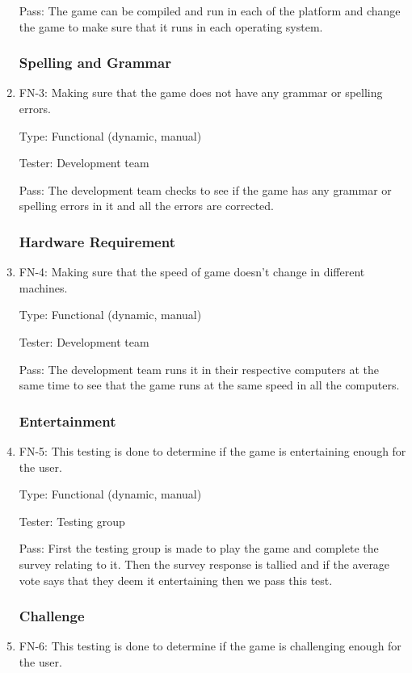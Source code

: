 \documentclass[12pt,letterpaper]{article}
\begin{document}
\begin{enumerate}
	Pass: The game can be compiled and run in each of the platform and change the game to make sure that it runs in each operating system.

	\subsubsection{Spelling and Grammar}
	\item FN-3: Making sure that the game does not have any grammar or spelling errors.

	Type: Functional (dynamic, manual)

	Tester: Development team

	Pass: The development team checks to see if the game has any grammar or spelling errors in it and all the errors are corrected.
	
	\subsubsection{Hardware Requirement}
	\item FN-4: Making sure that the speed of game doesn’t change in different machines. 

	Type: Functional (dynamic, manual)
	
	Tester: Development team
	
	Pass: The development team runs it in their respective computers at the same time to see that the game runs at the same speed in all the computers.

	\subsubsection{Entertainment}
	\item FN-5: This testing is done to determine if the game is entertaining enough for the user. 

	Type: Functional (dynamic, manual)

	Tester: Testing group

	Pass: First the testing group is made to play the game and complete the survey relating to it. Then the survey response is tallied and if the average vote says that they deem it entertaining then we pass this test.

	\subsubsection{Challenge}
	\item FN-6: This testing is done to determine if the game is challenging enough for the user. 


\end{enumerate}
\end{document}

